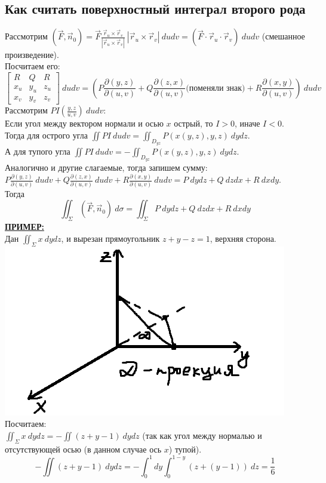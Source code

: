 \documentclass[12pt]{article}
\begin{document}
\subsection{Как считать поверхностный интеграл второго рода}
Рассмотрим $(\overrightarrow{F}, \overrightarrow{n}_0) = \overrightarrow{F} \frac{\overrightarrow{r}_u \times \overrightarrow{r}_v}{|\overrightarrow{r}_u \times \overrightarrow{r}_v|} \ |\overrightarrow{r}_u \times \overrightarrow{r}_v| \ dudv = (\overrightarrow{F} \cdot \overrightarrow{r}_u \cdot \overrightarrow{r}_v) \ dudv$ (смешанное произведение).\\
Посчитаем его:\\
$$\begin{bmatrix} R & Q & R \\ x_u & y_u & z_u \\ x_v & y_v & z_v \end{bmatrix} \ dudv = (P \frac{\partial (y,z)}{\partial(u,v)} + Q \frac{\partial (z,x)}{\partial(u,v)}\text{(поменяли знак)} + R\frac{\partial (x,y)}{\partial(u,v)}) \ dudv$$
Рассмотрим $PI (\frac{y,z}{u,v}) \ du dv$:\\
Если угол между вектором нормали и осью $x$ острый, то $I > 0$, иначе $I < 0$.\\
Тогда для острого угла $\iint PI \ du dv = \iint_{D_{yz}} P (x(y,z),y,z) \ dydz$.\\
А для тупого угла $\iint PI \ du dv = - \iint_{D_{yz}} P (x(y,z),y,z) \ dydz$.\\
Аналогично и другие слагаемые, тогда запишем сумму:\\
$P \frac{\partial (y,z)}{\partial(u,v)}\ dudv + Q \frac{\partial (z,x)}{\partial(u,v)}\ dudv + R\frac{\partial (x,y)}{\partial(u,v)} \ dudv = P\ dydz + Q\ dzdx + R \ dxdy$.\\
Тогда\\
$$\iint_\Sigma (\overrightarrow{F}, \overrightarrow{n}_0) \ d\sigma = \iint_\Sigma P \ dydz + Q \ dzdx + R \ dxdy$$
\uline{\textbf{ПРИМЕР:}}\\
Дан $\iint_\Sigma x \ dydz$, и вырезан прямоугольник $z + y - z = 1$, верхняя сторона.\\
\includegraphics{triangleCut1}
Посчитаем:\\
$\iint_\Sigma x \ dydz = - \iint (z+y-1)\ dydz$ (так как угол между нормалью и отсутствующей осью (в данном случае ось $x$) тупой).\\
$$- \iint (z+y-1)\ dydz = - \int_0^1 dy \int_0^{1-y}(z+(y-1))\ dz = \frac{1}{6}$$
\end{document}
